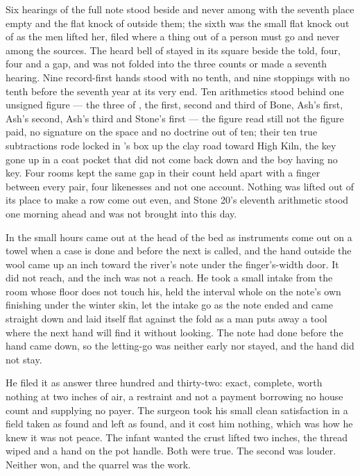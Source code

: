 Six hearings of the full note stood beside and never among with the seventh place empty and the flat knock of  outside them; the sixth was the small flat knock out of  as the men lifted her, filed where a thing out of a person must go and never among the sources. The heard bell of  stayed in its square beside the told, four, four and a gap, and was not folded into the three counts or made a seventh hearing. Nine record-first hands stood with no tenth, and nine stoppings with no tenth before the seventh year at its very end. Ten arithmetics stood behind one unsigned figure — the three of , the first, second and third of Bone, Ash's first, Ash's second, Ash's third and Stone's first — the figure read still not the figure paid, no signature on the space and no doctrine out of ten; their ten true subtractions rode locked in 's box up the clay road toward High Kiln, the key gone up in a coat pocket that did not come back down and the boy having no key. Four rooms kept the same gap in their count held apart with a finger between every pair, four likenesses and not one account. Nothing was lifted out of its place to make a row come out even, and Stone 20's eleventh arithmetic stood one morning ahead and was not brought into this day.

In the small hours  came out at the head of the bed as instruments come out on a towel when a case is done and before the next is called, and the hand outside the wool came up an inch toward the river's note under the finger's-width door. It did not reach, and the inch was not a reach. He took a small intake from the room whose floor does not touch his, held the interval whole on the note's own finishing under the winter skin, let the intake go as the note ended and came straight down and laid itself flat against the fold as a man puts away a tool where the next hand will find it without looking. The note had done before the hand came down, so the letting-go was neither early nor stayed, and the hand did not stay.

He filed it as answer three hundred and thirty-two: exact, complete, worth nothing at two inches of air, a restraint and not a payment borrowing no house count and supplying no payer. The surgeon took his small clean satisfaction in a field taken as found and left as found, and it cost him nothing, which was how he knew it was not peace. The infant wanted the crust lifted two inches, the thread wiped and a hand on the pot handle. Both were true. The second was louder. Neither won, and the quarrel was the work.

